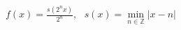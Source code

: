 \documentclass[preview]{standalone}
\begin{document}
\begin{align*}
f(x) = \frac{s(2^n x)}{2^n}, \text{  }s(x) = \min_{n \in \mathbb{Z}} |x - n|
\end{align*}
\end{document}
